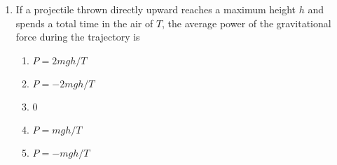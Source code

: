 \documentclass{../../../oss-apphys}
\begin{document}
\begin{multicols}{2}
\begin{enumerate}[leftmargin=18pt,resume]
%
%
%
    
  \item If a projectile thrown directly upward reaches a maximum height $h$ and
    spends a total time in the air of $T$, the average power of the
    gravitational force during the trajectory is
    \begin{enumerate}[noitemsep,topsep=0pt,leftmargin=18pt,label=(\Alph*)]
    \item $P=2mgh/T$
    \item $P=-2mgh/T$
    \item 0
    \item $P=mgh/T$
    \item $P=-mgh/T$
    \end{enumerate}


\end{enumerate}
\end{multicols}
\end{document}
